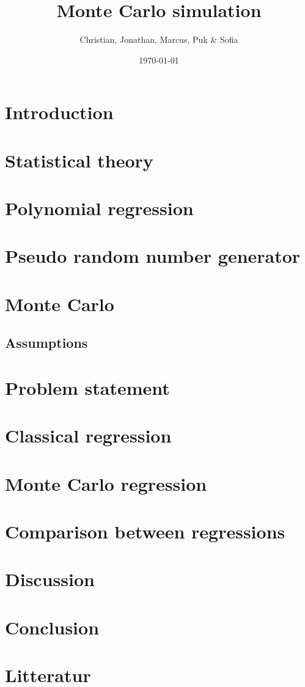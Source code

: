 \documentclass{article}
\title{Monte Carlo simulation}
\author{Christian, Jonathan, Marcus, Puk \& Sofia }
\date{\today}
\begin{document}
	\setcounter{section}{0}
	\maketitle
	\newpage
	\tableofcontents
	\newpage
	
	\section{Introduction}
	
	\newpage
	
	\section{Statistical theory}
	

	\newpage
	
	\section{Polynomial regression}
	
	\newpage
	
	\section{Pseudo random number generator}
	
	\newpage
	
	\section{Monte Carlo}
	\subsection{Assumptions}
	\newpage
	
	\section{Problem statement}
	\newpage
	
	\section{Classical regression}
	\newpage
	
	\section{Monte Carlo regression}
	\newpage
	
	\section{Comparison between regressions}
	\newpage
	
	\section{Discussion}
	\newpage
	
	\section{Conclusion}
	\newpage
	
 	\section{Litteratur}
  
\end{document}
